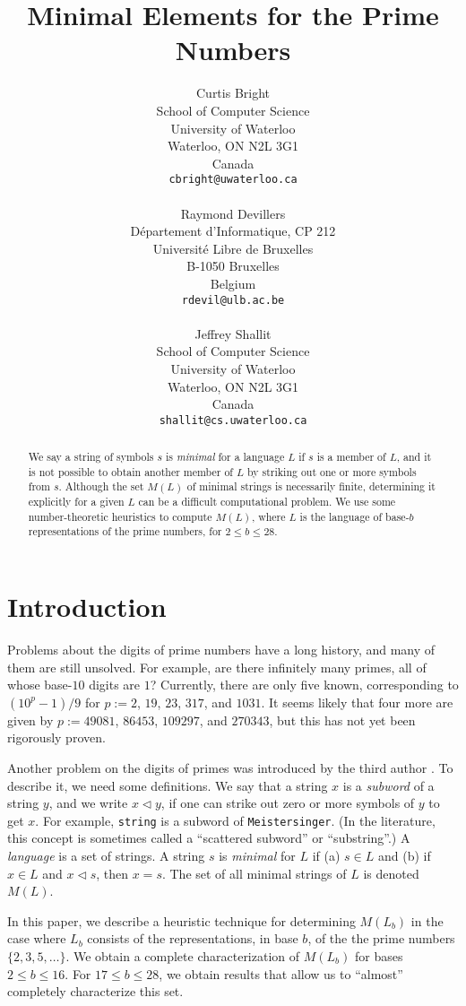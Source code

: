 \documentclass[12pt]{article}
\title{Minimal Elements for the Prime Numbers}
\author{Curtis Bright\\
School of Computer Science\\
University of Waterloo\\
Waterloo, ON  N2L 3G1\\
Canada\\
{\tt cbright@uwaterloo.ca} \\
\ \\
Raymond Devillers\\
D\'epartement d'Informatique, CP 212\\
Universit\'e Libre de Bruxelles \\
B-1050 Bruxelles\\
Belgium\\
{\tt rdevil@ulb.ac.be} \\
\ \\
Jeffrey Shallit \\
School of Computer Science\\
University of Waterloo\\
Waterloo, ON  N2L 3G1\\
Canada \\
{\tt shallit@cs.uwaterloo.ca}}
\def\subw{\mathrel{\triangleleft}}
\theoremstyle{plain}
\theoremstyle{definition}
\theoremstyle{remark}
\newcommand{\0}{\mathtt{0}}
\newcommand{\1}{\mathtt{1}}
\newcommand{\2}{\mathtt{2}}
\newcommand{\3}{\mathtt{3}}
\newcommand{\4}{\mathtt{4}}
\newcommand{\5}{\mathtt{5}}
\newcommand{\6}{\mathtt{6}}
\newcommand{\7}{\mathtt{7}}
\newcommand{\8}{\mathtt{8}}
\newcommand{\9}{\mathtt{9}}
\begin{document}
\maketitle

\begin{abstract}
We say a string of symbols $s$ is {\it minimal} for a language $L$
if $s$ is a member of $L$, and it is not possible to obtain another 
member of $L$ by striking out one or more symbols from $s$.  Although
the set $M(L)$ of minimal strings is necessarily finite, determining
it explicitly for a given $L$ can be a difficult computational problem.  
We use some number-theoretic heuristics to compute $M(L)$, where $L$
is the language of base-$b$ representations of the prime numbers,
for $2 \leq b \leq 28$.
\end{abstract}

\section{Introduction}

Problems about the digits of prime numbers have a long history, and many
of them are still unsolved.  For example, are there infinitely many
primes, all of whose base-$10$ digits are $1$?  Currently,
there are only five
known, corresponding to $(10^p-1)/9$ for $p := 2$, $19$, $23$, $317$, and
$1031$.  It seems likely that four more are given by
$p := 49081$, $86453$, $109297$, and $270343$, but this has not yet been
rigorously proven.

Another problem on the digits of primes was introduced by the
third author \cite{Sh00}.  To describe it, we need some definitions.
We say that a string $x$ is a {\it subword} of a string $y$, and 
we write $x \subw y$, if 
one can strike out zero or more symbols of $y$ to get $x$.
For example, {\tt string} is a subword of
{\tt Meistersinger}.  
(In the literature, this concept is sometimes called a ``scattered
subword'' or ``substring''.)
A {\it language} is a set of strings.  A string $s$ is {\it minimal}
for $L$ if  (a) $s \in L$ and (b) if $x \in L$ and $x \subw s$, then
$x = s$.    The set of all minimal strings of $L$ is denoted $M(L)$.

In this paper, we describe a heuristic
technique for determining $M(L_b)$ in the
case where $L_b$ consists of the representations, in base $b$, of the
the prime numbers $\lbrace 2, 3, 5, \dotsc \rbrace$.  We obtain
a complete characterization of $M(L_b)$ for bases
$2 \leq b \leq 16$.   For $17 \leq b \leq 28$, we obtain
results that allow us to ``almost'' completely characterize this set.
\end{document}
